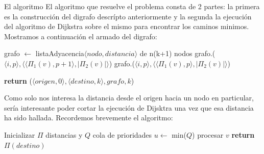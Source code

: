 \begin{subsection}{El algoritmo}
El algoritmo que resuelve el problema consta de 2 partes: la primera es la construcción del digrafo descr\'{i}pto anteriormente y la segunda la ejecución del algoritmo de Dijkstra sobre el mismo para encontrar los caminos minimos. Mostramos a continuación el armado del digrafo:

\begin{algorithm}[H]
  \begin{algorithmic}[1]
    \State  grafo $\gets$ listaAdyacencia$\langle nodo, distancia \rangle$ de n(k+1) nodos
                \State grafo.($\langle i, p \rangle, \langle \langle \Pi_1(v), p+1 \rangle, |\Pi_2(v)|\rangle$)
                \State grafo.($\langle i, p \rangle, \langle \langle \Pi_1(v), p \rangle, |\Pi_2(v)|\rangle$)
                \EndIf
            \EndFor
        \EndFor
    \EndFor
    
    \State \textbf{return} ($\langle origen,0\rangle, \langle destino, k \rangle, grafo, k$)
    \EndFunction    
  \end{algorithmic}
\end{algorithm}

\end{subsection}

Como solo nos interesa la distancia desde el origen hacia un nodo en particular, sería interesante poder cortar la ejecución de Dijsktra una vez que esa distancia ha sido hallada. Recordemos brevemente el algoritmo:

\begin{algorithm}[H]
\begin{algorithmic}[1]


    \State Inicializar $\Pi$ distancias y $Q$ cola de prioridades
        \State $u \gets$ min($Q$)
            \State procesar $v$
        \EndFor
    \EndWhile
    \State \textbf{return} $\Pi(destino)$
\EndFunction

\end{algorithmic}
\end{algorithm}

